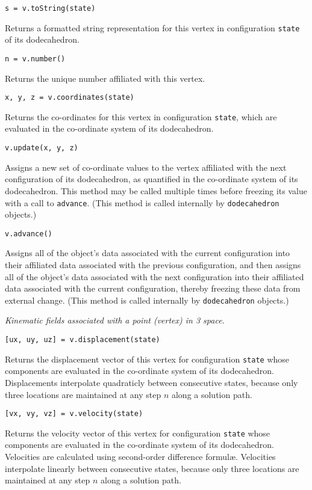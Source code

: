\medskip\noindent
\texttt{s = v.toString(state)}

\medskip\noindent 
Returns a formatted string representation for this vertex in configuration \texttt{state} of its dodecahedron.

\medskip\noindent
\texttt{n = v.number()} 

\medskip\noindent 
Returns the unique number affiliated with this vertex.

\medskip\noindent
\texttt{x, y, z = v.coordinates(state)} 

\medskip\noindent 
Returns the co-ordinates for this vertex in configuration \texttt{state}, which are evaluated in the co-ordinate system of its dodecahedron.

\newpage
\medskip\noindent
\texttt{v.update(x, y, z)} 

\medskip\noindent 
Assigns a new set of co-ordinate values to the vertex affiliated with the next configuration of its dodecahedron, as quantified in the co-ordinate system of its dodecahedron.  This method may be called multiple times before freezing its value with a call to \texttt{advance}.  (This method is called internally by \texttt{dodecahedron} objects.)

\medskip\noindent
\texttt{v.advance()} 

\medskip\noindent 
Assigns all of the object's data associated with the current configuration into their affiliated data associated with the previous configuration, and then assigns all of the object's data associated with the next configuration into their affiliated data associated with the current configuration, thereby freezing these data from external change. (This method is called internally by \texttt{dodecahedron} objects.)

\medskip\noindent
\textit{Kinematic fields associated with a point (vertex) in 3 space.}

\medskip\noindent
\texttt{[ux, uy, uz] = v.displacement(state)} 

\medskip\noindent 
Returns the displacement vector of this vertex for configuration \texttt{state} whose components are evaluated in the co-ordinate system of its dodecahedron.  Displacements interpolate quadraticly between consecutive states, because only three locations are maintained at any step $n$ along a solution path.

\medskip\noindent
\texttt{[vx, vy, vz] = v.velocity(state)} 

\medskip\noindent 
Returns the velocity vector of this vertex for configuration \texttt{state} whose components are evaluated in the co-ordinate system of its dodecahedron.  Velocities are calculated using second-order difference formul\ae. Velocities interpolate linearly between consecutive states, because only three locations are maintained at any step $n$ along a solution path.

